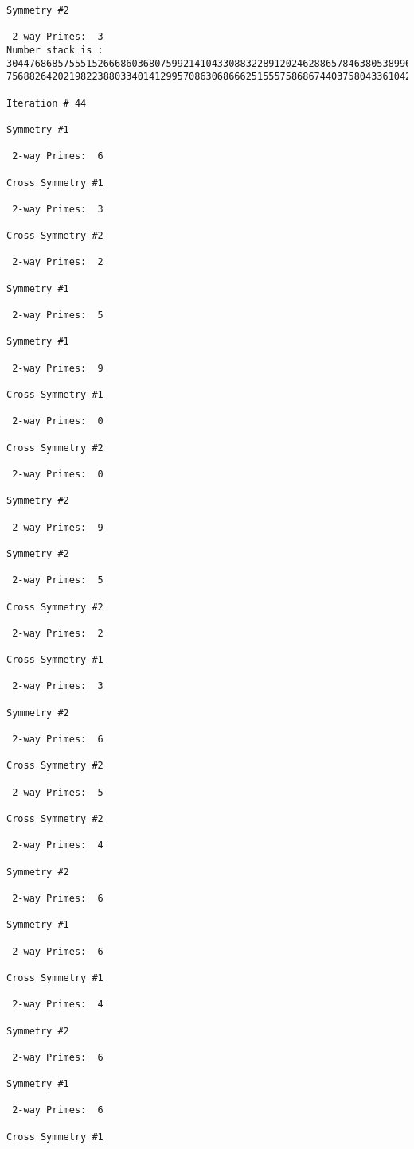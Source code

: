 {{{{\begin{verbatim}
Symmetry #2

 2-way Primes: 	3
Number stack is :
30447686857555152666860368075992141043308832289120246288657846380538996794608835958544046240163340857
75688264202198223880334014129957086306866625155575868674403758043361042640445859538806497699835083648

Iteration #	44

Symmetry #1

 2-way Primes: 	6

Cross Symmetry #1

 2-way Primes: 	3

Cross Symmetry #2

 2-way Primes: 	2

Symmetry #1

 2-way Primes: 	5

Symmetry #1

 2-way Primes: 	9

Cross Symmetry #1

 2-way Primes: 	0

Cross Symmetry #2

 2-way Primes: 	0

Symmetry #2

 2-way Primes: 	9

Symmetry #2

 2-way Primes: 	5

Cross Symmetry #2

 2-way Primes: 	2

Cross Symmetry #1

 2-way Primes: 	3

Symmetry #2

 2-way Primes: 	6

Cross Symmetry #2

 2-way Primes: 	5

Cross Symmetry #2

 2-way Primes: 	4

Symmetry #2

 2-way Primes: 	6

Symmetry #1

 2-way Primes: 	6

Cross Symmetry #1

 2-way Primes: 	4

Symmetry #2

 2-way Primes: 	6

Symmetry #1

 2-way Primes: 	6

Cross Symmetry #1


\end{verbatim}}}}}
